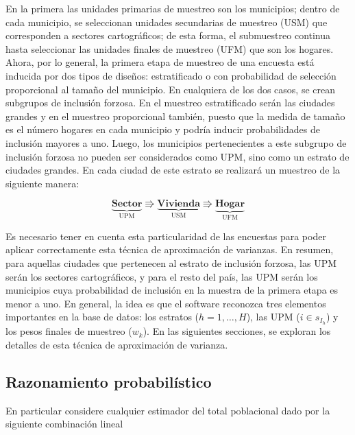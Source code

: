 \documentclass[
  12pt,
  spanish,
]{book}
\begin{document}
En la primera las unidades primarias de muestreo son los municipios; dentro de cada municipio, se seleccionan unidades secundarias de muestreo (USM) que corresponden a sectores cartográficos; de esta forma, el submuestreo continua hasta seleccionar las unidades finales de muestreo (UFM) que son los hogares. Ahora, por lo general, la primera etapa de muestreo de una encuesta está inducida por dos tipos de diseños: estratificado o con probabilidad de selección proporcional al tamaño del municipio. En cualquiera de los dos casos, se crean subgrupos de inclusión forzosa. En el muestreo estratificado serán las ciudades grandes y en el muestreo proporcional también, puesto que la medida de tamaño es el número hogares en cada municipio y podría inducir probabilidades de inclusión mayores a uno. Luego, los municipios pertenecientes a este subgrupo de inclusión forzosa no pueden ser considerados como UPM, sino como un estrato de ciudades grandes. En cada ciudad de este estrato se realizará un muestreo de la siguiente manera:

\begin{equation*}
\underbrace{\textbf{Sector}}_{\text{UPM}} \Rrightarrow
\underbrace{\textbf{Vivienda}}_{\text{USM}} \Rrightarrow
\underbrace{\textbf{Hogar}}_{\text{UFM}}
\end{equation*}

Es necesario tener en cuenta esta particularidad de las encuestas para poder aplicar correctamente esta técnica de aproximación de varianzas. En resumen, para aquellas ciudades que pertenecen al estrato de inclusión forzosa, las UPM serán los sectores cartográficos, y para el resto del país, las UPM serán los municipios cuya probabilidad de inclusión en la muestra de la primera etapa es menor a uno. En general, la idea es que el software reconozca tres elementos importantes en la base de datos: los estratos (\(h=1,\ldots, H\)), las UPM (\(i \in s_{I_h}\)) y los pesos finales de muestreo (\(w_k\)). En las siguientes secciones, se exploran los detalles de esta técnica de aproximación de varianza.

\hypertarget{razonamiento-probabiluxedstico}{%
\subsection{Razonamiento probabilístico}\label{razonamiento-probabiluxedstico}}

En particular considere cualquier estimador del total poblacional dado por la siguiente combinación lineal
\end{document}
